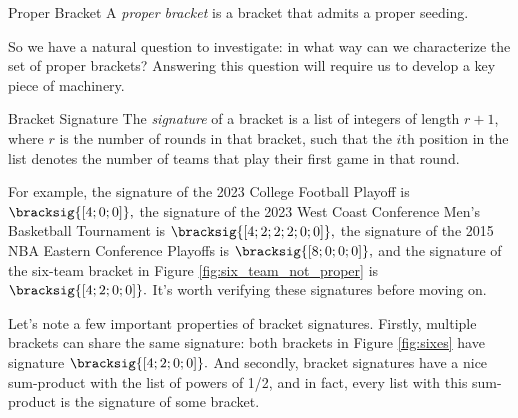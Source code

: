 {

\begin{definition}{Proper Bracket}{}
    A \textit{proper bracket} is a bracket that admits a proper seeding.
\end{definition}


So we have a natural question to investigate: in what way can we characterize the set of proper brackets? Answering this question will require us to develop a key piece of machinery.
    
\begin{definition}{Bracket Signature}{}
    The \textit{signature} of a bracket is a list of integers of length $r + 1$, where $r$ is the number of rounds in that bracket, such that the $i$th position in the list denotes the number of teams that play their first game in that round.
\end{definition}

For example, the signature of the 2023 College Football Playoff is $\bracksig{[4; 0; 0]},$ the signature of the 2023 West Coast Conference Men's Basketball Tournament is $\bracksig{[4;2;2;2;0;0]},$ the signature of the 2015 NBA Eastern Conference Playoffs is $\bracksig{[8; 0; 0; 0]}
,$ and the signature of the six-team bracket in Figure \ref{fig:six_team_not_proper} is $\bracksig{[4; 2; 0; 0]}.$ It's worth verifying these signatures before moving on.

Let's note a few important properties of bracket signatures. Firstly, multiple brackets can share the same signature: both brackets in Figure \ref{fig:sixes} have signature $\bracksig{[4;2;0;0]}.$
And secondly, bracket signatures have a nice sum-product with the list of powers of 1/2, and in fact, every list with this sum-product is the signature of some bracket.

}
